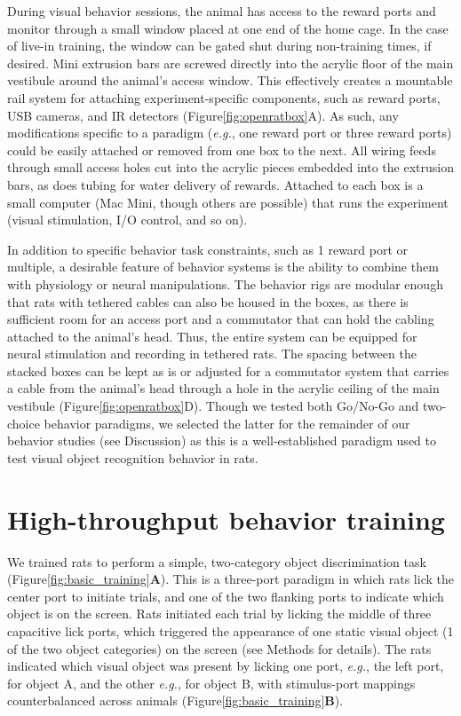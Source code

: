 During visual behavior sessions, the animal has access to the reward ports and monitor through a small window placed at one end of the home cage. In the case of live-in training, the window can be gated shut during non-training times, if desired. Mini extrusion bars are screwed directly into the acrylic floor of the main vestibule around the animal's access window. This effectively creates a mountable rail system for attaching experiment-specific components, such as reward ports, USB cameras, and IR detectors (Figure\ref{fig:openratbox}A). As such, any modifications specific to a paradigm (\textit{e.g.}, one reward port or three reward ports) could be easily attached or removed from one box to the next. All wiring feeds through small access holes cut into the acrylic pieces embedded into the extrusion bars, as does tubing for water delivery of rewards. Attached to each box is a small computer (Mac Mini, though others are possible) that runs the experiment (visual stimulation, I/O control, and so on). 

In addition to specific behavior task constraints, such as 1 reward port or multiple, a desirable feature of behavior systems is the ability to combine them with physiology or neural manipulations. The behavior rigs are modular enough that rats with tethered cables can also be housed in the boxes, as there is sufficient room for an access port and a commutator that can hold the cabling attached to the animal's head. Thus, the entire system can be equipped for neural stimulation and recording in tethered rats. The spacing between the stacked boxes can be kept as is or adjusted for a commutator system that carries a cable from the animal's head through a hole in the acrylic ceiling of the main vestibule (Figure\ref{fig:openratbox}D). Though we tested both Go/No-Go and two-choice behavior paradigms, we selected the latter for the remainder of our behavior studies (see Discussion) as this is a well-established paradigm used to test visual object recognition behavior in rats\cite{Lashley1930, Zoccolan2009, Prusky2000}.

\section{High-throughput behavior training}
We trained rats to perform a simple, two-category object discrimination task\cite{Zoccolan2009} (Figure\ref{fig:basic_training}\textbf{A}). This is a three-port paradigm in which rats lick the center port to initiate trials, and one of the two flanking ports to indicate which object is on the screen. Rats initiated each trial by licking the middle of three capacitive lick ports, which triggered the appearance of one static visual object (1 of the two object categories) on the screen (see Methods for details). The rats indicated which visual object was present by licking one port, \textit{e.g.}, the left port, for object A, and the other \textit{e.g.}, for object B, with stimulus-port mappings counterbalanced across animals (Figure\ref{fig:basic_training}\textbf{B}).

